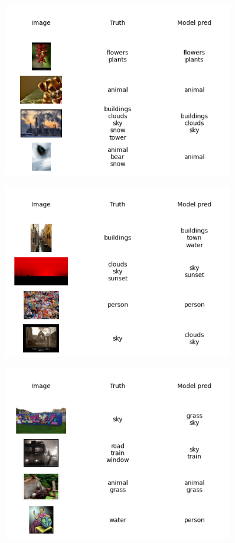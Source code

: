 \documentclass{udstu}
\begin{document}
\begin{figure}[!ht]
	\centering
	\includegraphics[width=0.9\textwidth]{PNG/showcase-275}
	\caption{}
\end{figure}

\begin{figure}[!ht]
	\centering
	\includegraphics[width=0.9\textwidth]{PNG/showcase-300}
	\caption{}
\end{figure}

\begin{figure}[!ht]
	\centering
	\includegraphics[width=0.9\textwidth]{PNG/showcase-325}
	\caption{}
\end{figure}
\end{document}

